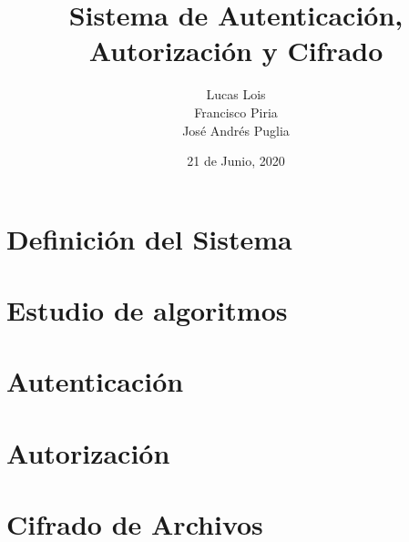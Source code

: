 \documentclass[12pt]{report}
\title{Sistema de Autenticación, Autorización y Cifrado}
\author{
	Lucas Lois \\
	Francisco Piria \\
	José Andrés Puglia
}
\date{21 de Junio, 2020}
\begin{document}


\tableofcontents

\chapter{Definición del Sistema}


\chapter{Estudio de algoritmos}


\chapter{Autenticación}


\chapter{Autorización}


\chapter{Cifrado de Archivos}


\pagebreak
\printbibliography{}
\end{document}
